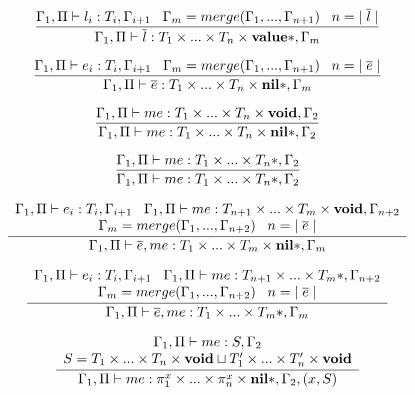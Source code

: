 \[
\dfrac{\Gamma_{1}, \Pi \vdash l_{i}:T_{i}, \Gamma_{i+1} \;\;\;
       \Gamma_{m} = merge(\Gamma_{1}, ..., \Gamma_{n+1}) \;\;\;
       n = |\;\overline{l}\;|}
      {\Gamma_{1}, \Pi \vdash \overline{l}:T_{1} \times ... \times T_{n} \times \mathbf{value}{*}, \Gamma_{m}}
\]

\[
\dfrac{\Gamma_{1}, \Pi \vdash e_{i}:T_{i}, \Gamma_{i+1} \;\;\;
       \Gamma_{m} = merge(\Gamma_{1}, ..., \Gamma_{n+1}) \;\;\;
       n = |\;\overline{e}\;|}
      {\Gamma_{1}, \Pi \vdash \overline{e}:T_{1} \times ... \times T_{n} \times \mathbf{nil}{*}, \Gamma_{m}}
\]

\[
\dfrac{\Gamma_{1}, \Pi \vdash me:T_{1} \times ... \times T_{n} \times \mathbf{void}, \Gamma_{2}}
      {\Gamma_{1}, \Pi \vdash me:T_{1} \times ... \times T_{n} \times \mathbf{nil}{*}, \Gamma_{2}}
\]

\[
\dfrac{\Gamma_{1}, \Pi \vdash me:T_{1} \times ... \times T_{n}{*}, \Gamma_{2}}
      {\Gamma_{1}, \Pi \vdash me:T_{1} \times ... \times T_{n}{*}, \Gamma_{2}}
\]

\[
\dfrac{\begin{array}{c}
       \Gamma_{1}, \Pi \vdash e_{i}:T_{i}, \Gamma_{i+1} \;\;\;
       \Gamma_{1}, \Pi \vdash me:T_{n+1} \times ... \times T_{m} \times \mathbf{void}, \Gamma_{n+2}\\
       \Gamma_{m} = merge(\Gamma_{1}, ..., \Gamma_{n+2}) \;\;\;
       n = |\;\overline{e}\;|
       \end{array}}
      {\Gamma_{1}, \Pi \vdash \overline{e},me:T_{1} \times ... \times T_{m} \times \mathbf{nil}{*}, \Gamma_{m}}
\]

\[
\dfrac{\begin{array}{c}
       \Gamma_{1}, \Pi \vdash e_{i}:T_{i}, \Gamma_{i+1} \;\;\;
       \Gamma_{1}, \Pi \vdash me:T_{n+1} \times ... \times T_{m}{*}, \Gamma_{n+2}\\
       \Gamma_{m} = merge(\Gamma_{1}, ..., \Gamma_{n+2}) \;\;\;
       n = |\;\overline{e}\;|
       \end{array}}
      {\Gamma_{1}, \Pi \vdash \overline{e},me:T_{1} \times ... \times T_{m}{*}, \Gamma_{m}}
\]

\[
\dfrac{\begin{array}{c}
       \Gamma_{1}, \Pi \vdash me:S, \Gamma_{2}\\
       S = T_{1} \times ... \times T_{n} \times \mathbf{void} \sqcup T_{1}' \times ... \times T_{n}' \times \mathbf{void}
       \end{array}}
      {\Gamma_{1}, \Pi \vdash me:\pi_{1}^{x} \times ... \times \pi_{n}^{x} \times \mathbf{nil}{*}, \Gamma_{2}, (x,S)}
\]


